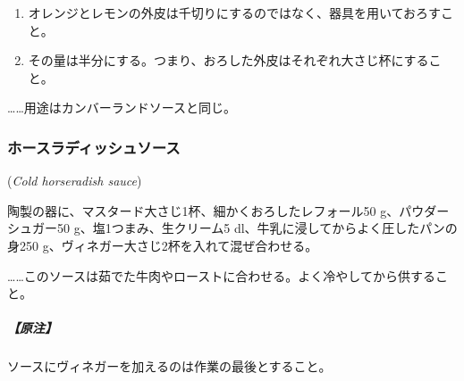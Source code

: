 \begin{recette}
\begin{enumerate}
\def\labelenumi{\arabic{enumi}.}
\item
  オレンジとレモンの外皮は千切りにするのではなく、器具を用いておろすこと。
\item
  その量は半分にする。つまり、おろした外皮はそれぞれ大さじ\undemi{}杯にすること。
\end{enumerate}

\ldots{}\ldots{}用途はカンバーランドソースと同じ。

\maeaki

\hypertarget{cold-horseradish-sauce}{%
\subsubsection{ホースラディッシュソース}\label{cold-horseradish-sauce}}

\hspace{1em}(\emph{Cold horseradish sauce})


陶製の器に、マスタード大さじ1杯、細かくおろしたレフォール50
g、パウダーシュガー50 g、塩1つまみ、生クリーム5
dl、牛乳に浸してからよく圧したパンの身250
g、ヴィネガー大さじ2杯を入れて混ぜ合わせる。

\ldots{}\ldots{}このソースは茹でた牛肉やローストに合わせる。よく冷やしてから供すること。

\hypertarget{horseradish-sauce}{%
\subparagraph{【原注】}\label{horseradish-sauce}}

ソースにヴィネガーを加えるのは作業の最後とすること。
\end{recette}
